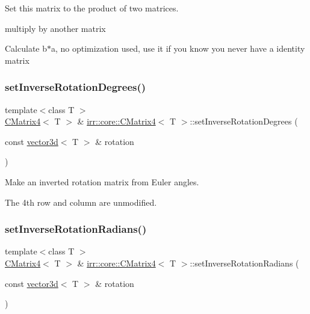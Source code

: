 Set this matrix to the product of two matrices. 

multiply by another matrix

Calculate b$\ast$a, no optimization used, use it if you know you never have a identity matrix \mbox{\label{classirr_1_1core_1_1CMatrix4_afd84b9c93b4c8e9dc2abefa4a28057f9}} 
\subsubsection{\texorpdfstring{set\+Inverse\+Rotation\+Degrees()}{setInverseRotationDegrees()}}
{\footnotesize\ttfamily template$<$class T $>$ \\
\hyperlink{classirr_1_1core_1_1CMatrix4}{C\+Matrix4}$<$ T $>$ \& \hyperlink{classirr_1_1core_1_1CMatrix4}{irr\+::core\+::\+C\+Matrix4}$<$ T $>$\+::set\+Inverse\+Rotation\+Degrees (\begin{DoxyParamCaption}\item[{const \hyperlink{classirr_1_1core_1_1vector3d}{vector3d}$<$ T $>$ \&}]{rotation }\end{DoxyParamCaption})\hspace{0.3cm}{\ttfamily [inline]}}



Make an inverted rotation matrix from Euler angles. 

The 4th row and column are unmodified. \mbox{\label{classirr_1_1core_1_1CMatrix4_a1a15d7b55769678512144f0fb7e15a92}} 
\subsubsection{\texorpdfstring{set\+Inverse\+Rotation\+Radians()}{setInverseRotationRadians()}}
{\footnotesize\ttfamily template$<$class T $>$ \\
\hyperlink{classirr_1_1core_1_1CMatrix4}{C\+Matrix4}$<$ T $>$ \& \hyperlink{classirr_1_1core_1_1CMatrix4}{irr\+::core\+::\+C\+Matrix4}$<$ T $>$\+::set\+Inverse\+Rotation\+Radians (\begin{DoxyParamCaption}\item[{const \hyperlink{classirr_1_1core_1_1vector3d}{vector3d}$<$ T $>$ \&}]{rotation }\end{DoxyParamCaption})\hspace{0.3cm}{\ttfamily [inline]}}



